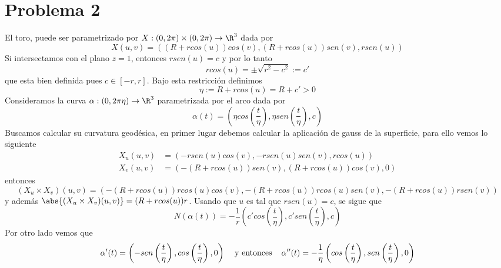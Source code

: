 \documentclass{article}
\begin{document}
\section*{Problema 2}
\noindent El toro, puede ser parametrizado por $X:(0,2\pi)\times(0,2\pi)\to\R^{3}$ dada por
\begin{equation*}
    X(u,v)=((R+rcos(u))cos(v),(R+rcos(u))sen(v),rsen(u))
\end{equation*}
Si intersectamos con el plano $z=1$, entonces $rsen(u)=c$ y por lo tanto
\begin{equation*}
    rcos(u)=\pm\sqrt{r^{2}-c^{2}}:=c'
\end{equation*}
que esta bien definida pues $c\in[-r,r]$. Bajo esta restricción definimos
\begin{equation*}
    \eta:=R+rcos(u)=R+c'>0
\end{equation*}
Consideramos la curva $\alpha:(0,2\pi\eta)\to\R^{3}$ parametrizada por el arco dada por
\begin{equation*}
    \alpha(t)=\left(\eta cos\left(\frac{t}{\eta}\right),\eta sen\left(\frac{t}{\eta}\right),
    c\right)
\end{equation*}
Buscamos calcular su curvatura geodésica, en primer lugar debemos calcular la aplicación de gauss
de la superficie, para ello vemos lo siguiente
\begin{align*}
    X_{u}(u,v) &= (-rsen(u)cos(v),-rsen(u)sen(v),rcos(u)) \\
    X_{v}(u,v) &= (-(R+rcos(u))sen(v),(R+rcos(u))cos(v),0)
\end{align*}
entonces
\begin{equation*}
    (X_{u}\times X_{v})(u,v)=(-(R+rcos(u))rcos(u)cos(v),-(R+rcos(u))rcos(u)sen(v),
    -(R+rcos(u))rsen(v))
\end{equation*}
y además $\abs{(X_{u}\times X_{v})(u,v)}=(R+rcos(u))r$. Usando que $u$ es tal que $rsen(u)=c$, se
sigue que
\begin{equation*}
    N(\alpha(t))=-\frac{1}{r}\left(c'cos\left(\frac{t}{\eta}\right),
    c'sen\left(\frac{t}{\eta}\right),c\right)
\end{equation*}
Por otro lado vemos que
\begin{equation*}
    \alpha'(t)=\left(-sen\left(\frac{t}{\eta}\right),cos\left(\frac{t}{\eta}\right),0\right)
    \hspace{4mm}\text{y entonces}\hspace{4mm}
    \alpha''(t)=-\frac{1}{\eta}\left(cos\left(\frac{t}{\eta}\right),
    sen\left(\frac{t}{\eta}\right),0\right)
\end{equation*}
\end{document}
